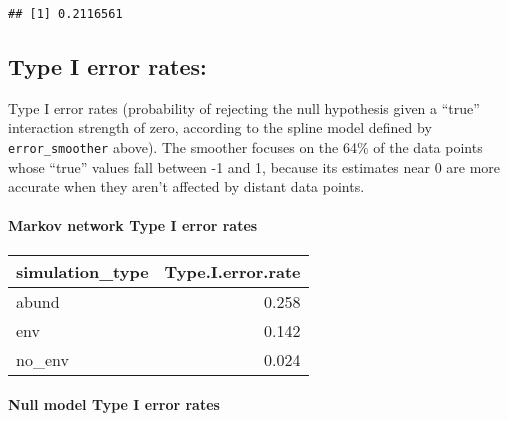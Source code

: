 \documentclass[11pt,]{article}
\newenvironment{Shaded}{\begin{snugshade}}{\end{snugshade}}
\newcommand{\KeywordTok}[1]{\textcolor[rgb]{0.13,0.29,0.53}{\textbf{{#1}}}}
\newcommand{\DataTypeTok}[1]{\textcolor[rgb]{0.13,0.29,0.53}{{#1}}}
\newcommand{\DecValTok}[1]{\textcolor[rgb]{0.00,0.00,0.81}{{#1}}}
\newcommand{\StringTok}[1]{\textcolor[rgb]{0.31,0.60,0.02}{{#1}}}
\newcommand{\NormalTok}[1]{{#1}}
\let\oldparagraph\paragraph
\renewcommand{\paragraph}[1]{\oldparagraph{#1}\mbox{}}
\begin{document}
\begin{verbatim}
## [1] 0.2116561
\end{verbatim}

\subsection{Type I error rates:}\label{type-i-error-rates}

Type I error rates (probability of rejecting the null hypothesis given a
``true'' interaction strength of zero, according to the spline model
defined by \texttt{error\_smoother} above). The smoother focuses on the
64\% of the data points whose ``true'' values fall between -1 and 1,
because its estimates near 0 are more accurate when they aren't affected
by distant data points.

\paragraph{Markov network Type I error
rates}\label{markov-network-type-i-error-rates}

\begin{Shaded}
\end{Shaded}

\begin{longtable}[c]{@{}lr@{}}
\toprule
simulation\_type & Type.I.error.rate\tabularnewline
\midrule
\endhead
abund & 0.258\tabularnewline
env & 0.142\tabularnewline
no\_env & 0.024\tabularnewline
\bottomrule
\end{longtable}

\paragraph{Null model Type I error
rates}\label{null-model-type-i-error-rates}
\end{document}
